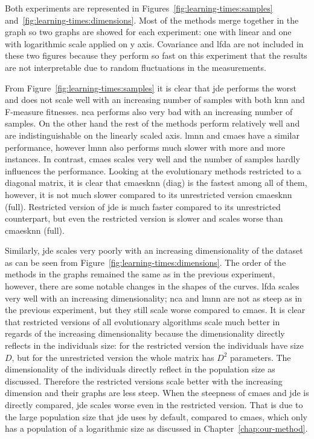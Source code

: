 \documentclass[12pt,a4paper]{report}
\begin{document}
Both experiments are represented in Figures~\ref{fig:learning-times:samples} and~\ref{fig:learning-times:dimensions}. Most of the methods merge together in the graph so two graphs are showed for each experiment: one with linear and one with logarithmic scale applied on y axis. Covariance and \ac{lfda} are not included in these two figures because they perform so fast on this experiment that the results are not interpretable due to random fluctuations in the measurements.

From Figure~\ref{fig:learning-times:samples} it is clear that \ac{jde} performs the worst and does not scale well with an increasing number of samples with both \ac{knn} and F-measure fitnesses. \ac{nca} performs also very bad with an increasing number of samples. On the other hand the rest of the methods perform relatively well and are indistinguishable on the linearly scaled axis. \ac{lmnn} and \ac{cmaes} have a similar performance, however \ac{lmnn} also performs much slower with more and more instances. In contrast, \ac{cmaes} scales very well and the number of samples hardly influences the performance. Looking at the evolutionary methods restricted to a diagonal matrix, it is clear that \ac{cmaesknn} (diag) is the fastest among all of them, however, it is not much slower compared to its unrestricted version \ac{cmaesknn} (full). Restricted version of \ac{jde} is much faster compared to its unrestricted counterpart, but even the restricted version is slower and scales worse than \ac{cmaesknn} (full).


Similarly, \ac{jde} scales very poorly with an increasing dimensionality of the dataset as can be seen from Figure~\ref{fig:learning-times:dimensions}. The order of the methods in the graphs remained the same as in the previous experiment, however, there are some notable changes in the shapes of the curves. \ac{lfda} scales very well with an increasing dimensionality; \ac{nca} and \ac{lmnn} are not as steep as in the previous experiment, but they still scale worse compared to \ac{cmaes}. It is clear that restricted versions of all evolutionary algorithms scale much better in regards of the increasing dimensionality because the dimensionality directly reflects in the individuals size: for the restricted version the individuals have size $D$, but for the unrestricted version the whole matrix has $D^2$ parameters. The dimensionality of the individuals directly reflect in the population size as discussed. Therefore the restricted versions scale better with the increasing dimension and their graphs are less steep. When the steepness of \ac{cmaes} and \ac{jde} is directly compared, \ac{jde} scales worse even in the restricted version. That is due to the large population size that \ac{jde} uses by default, compared to \ac{cmaes}, which only has a population of a logarithmic size as discussed in Chapter~\ref{chap:our-method}.
\end{document}
